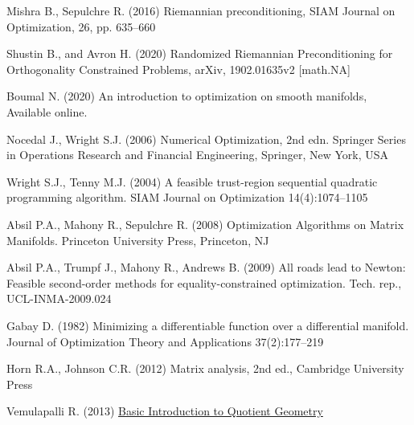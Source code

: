 \documentclass[11pt,a4paper]{article}
\begin{document}
\begin{thebibliography}{9}
Mishra B., Sepulchre R. (2016) Riemannian preconditioning, SIAM Journal on Optimization, 26, pp. 635–660

Shustin B., and Avron H. (2020) Randomized Riemannian Preconditioning for Orthogonality Constrained Problems, arXiv, 1902.01635v2 [math.NA]

Boumal N. (2020) An introduction to optimization on smooth manifolds, Available online.

Nocedal J., Wright S.J. (2006) Numerical Optimization, 2nd edn. Springer Series in Operations Research and Financial Engineering, Springer, New York, USA

Wright S.J., Tenny M.J. (2004) A feasible trust-region sequential quadratic programming algorithm. SIAM Journal on Optimization 14(4):1074–1105

Absil P.A., Mahony R., Sepulchre R. (2008) Optimization Algorithms on Matrix Manifolds.
Princeton University Press, Princeton, NJ

Absil P.A., Trumpf J., Mahony R., Andrews B. (2009) All roads lead to Newton: Feasible second-order methods for equality-constrained optimization. Tech. rep., UCL-INMA-2009.024

Gabay D. (1982) Minimizing a differentiable function over a differential manifold. Journal of Optimization Theory and Applications 37(2):177–219

Horn  R.A., Johnson C.R. (2012) Matrix analysis, 2nd ed., Cambridge University Press

Vemulapalli R. (2013)  \href{http://ravitejav.weebly.com/uploads/2/4/7/2/24725306/quotient_geometry.pdf}{Basic Introduction to Quotient Geometry}


\end{thebibliography}
\end{document}
